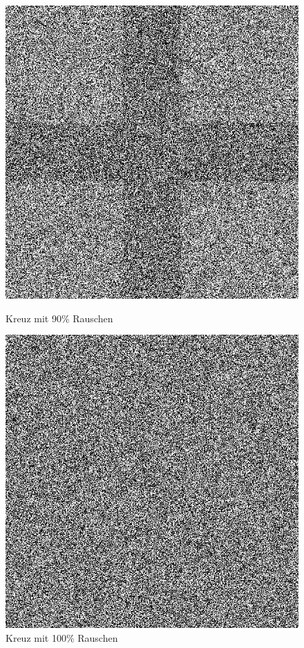 \begin{figure}[hbt]
	\begin{minipage}{0.49 \textwidth}
		\includegraphics[width=\textwidth]{./Bilder/Auswertung/BeispielBilder/Picture_Crossing_noise_90_pixelCnt_128_featureCnt_5}
		\caption{Kreuz mit 90\% Rauschen}
	\end{minipage}
	\hfill
	\begin{minipage}{0.49 \textwidth}
		\includegraphics[width=\textwidth]{./Bilder/Auswertung/BeispielBilder/Picture_Crossing_noise_100_pixelCnt_128_featureCnt_5}
		\caption{Kreuz mit 100\% Rauschen}
	\end{minipage}
\end{figure}

